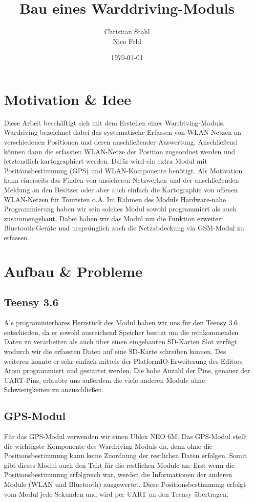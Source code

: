 \documentclass[a4paper,11pt, ngerman]{scrartcl}
\author{Christian Stahl\\Nico Feld}
\title{Bau eines Warddriving-Moduls}
\date{\today}
\begin{document}
\maketitle
\pagebreak
{}
\tableofcontents
\pagebreak
\section{Motivation \& Idee}
Diese Arbeit beschäftigt sich mit dem Erstellen eines Wardriving-Moduls. \grqq Wardriving\grqq{} bezeichnet dabei das systematische Erfassen von WLAN-Netzen an verschiedenen Positionen und deren anschließender Auswertung. Anschließend können dann die erfassten WLAN-Netze der Position zugeordnet werden und letztendlich kartographiert werden. Dafür wird ein extra Modul mit Positionsbestimmung (GPS) und WLAN-Komponente benötigt. Als Motivation kann einerseits das Finden von unsicheren Netzwerken und der anschließenden Meldung an den Besitzer oder aber auch einfach die Kartographie von offenen WLAN-Netzen für Touristen o.Ä. Im Rahmen des Moduls \grqq Hardware-nahe Programmierung\grqq{} haben wir sein solches Modul sowohl programmiert als auch zusammengebaut. Dabei haben wir das Modul um die Funktion erweitert Bluetooth-Geräte und ursprünglich auch die Netzabdeckung via GSM-Modul zu erfassen.
\section{Aufbau \& Probleme}
\subsection{Teensy 3.6}
Als programmierbares \grqq Herzstück\grqq{} des Modul haben wir uns für den Teensy 3.6 entschieden, da er sowohl ausreichend Speicher besitzt um die reinkommenden Daten zu verarbeiten als auch über einen eingebauten SD-Karten Slot verfügt wodurch wir die erfassten Daten auf eine SD-Karte schreiben können. Des weiteren konnte er sehr einfach mittels der \grqq PlatformIO\grqq{}-Erweiterung des Editors \grqq Atom\grqq{} programmiert und gestartet werden. Die hohe Anzahl der Pins, genauer der UART-Pins, erlaubte uns außerdem die viele anderen Module ohne Schwierigkeiten zu anzuschließen.
\subsection{GPS-Modul}
Für das GPS-Modul verwenden wir einen Ublox NEO 6M.
Das GPS-Modul stellt die wichtigste Komponente des Wardriving-Moduls da, denn ohne die Positionsbestimmung kann keine Zuordnung der restlichen Daten erfolgen. Somit gibt dieses Modul auch den \grqq Takt\grqq{} für die restlichen Module an: Erst wenn die Positionsbestimmung erfolgreich war, werden die Informationen der anderen Module (WLAN und Bluetooth) ausgewertet. Diese Positionsbestimmung erfolgt vom Modul jede Sekunden und wird per UART an den Teensy übertragen.
\end{document}

